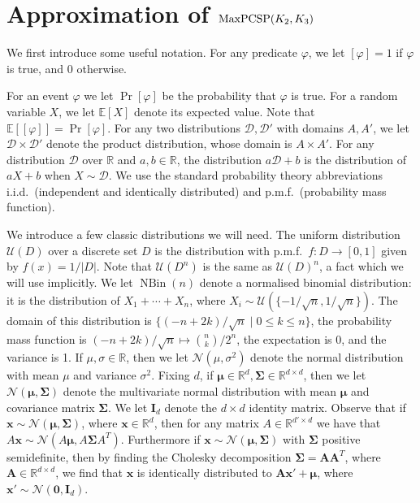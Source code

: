 \documentclass[a4paper,11pt, DIV=11]{scrartcl}
\newcommand{\vx}{\ensuremath{\mathbf{x}}}
\renewcommand{\phi}{\varphi}
\DeclareMathOperator{\NBin}{NBin}
\DeclareMathOperator{\maxPCSP}{\textup{MaxPCSP}}
\renewcommand{\R}{\ensuremath{\mathbb{R}}}
\theoremstyle{plain}
\theoremstyle{definition}
\begin{document}
    

\section{\texorpdfstring{Approximation of $\maxPCSP(K_2,K_3)$}{Approximation of maxPCSP(K2,K3)}}
\label{sec:23}

We first introduce some useful notation.
For any predicate $\phi$, we let $[\phi] = 1$ if $\phi$ is true, and $0$ otherwise.

For an event $\phi$ we let $\Pr [\phi]$ be the probability that $\phi$ is true. For a random variable $X$, we let $\mathbb{E}[X]$ denote its expected value. Note that $\mathbb{E}[ [\phi]] = \Pr[\phi]$.
For any two distributions $\mathcal{D}, \mathcal{D}'$ with domains $A, A'$, we let $\mathcal{D} \times \mathcal{D}'$ denote the product distribution, whose domain is $A \times A'$.
For any distribution $\mathcal{D}$ over $\R$ and $a, b \in \R$, the distribution $a\mathcal{D} + b$ is the distribution of $aX + b$ when $X \sim \mathcal{D}$.
We use the standard probability theory abbreviations i.i.d.~(independent and identically distributed) and p.m.f.~(probability mass function).

We introduce a few classic distributions we will need. The uniform distribution $\mathcal{U}(D)$ over a discrete set $D$ is the distribution with p.m.f.~$f : D \to [0, 1]$ given by $f(x) = 1 / |D|$. Note that $\mathcal{U}(D^n)$ is the same as ${\mathcal{U}(D)}^n$, a fact which we will use implicitly. We let $\NBin(n)$ denote a normalised binomial distribution: it is the distribution of $X_1 + \cdots + X_n$, where $X_i \sim \mathcal{U}(\{-1/\sqrt{n}, 1/\sqrt{n}\})$. The domain of this distribution is $\{(-n + 2k) / \sqrt{n} \mid 0 \leq k \leq n\}$, the probability mass function is $(-n + 2k)/\sqrt{n} \mapsto \binom{n}{k} / 2^n$, the expectation is 0, and the variance is 1.
If $\mu, \sigma \in \R$, then we let $\mathcal{N}(\mu, \sigma^2)$ denote the normal distribution with mean $\mu$ and variance $\sigma^2$. Fixing $d$, if $\mathbf{\mu} \in \R^d, \mathbf{\Sigma} \in \R^{d\times d}$, then we let $\mathcal{N}(\mathbf{\mu}, \mathbf{\Sigma})$ denote the multivariate normal distribution with mean $\mathbf{\mu}$ and covariance matrix $\mathbf{\Sigma}$. We let $\mathbf{I}_d$ denote the $d \times d$ identity matrix. Observe that if $\mathbf{x} \sim \mathcal{N}( \mathbf{\mu}, \mathbf{\Sigma})$, where $\mathbf{x} \in \R^d$, then for any matrix $A \in \R^{d' \times d}$ we have that $A \mathbf{x} \sim \mathcal{N}(A \mathbf{\mu}, A \mathbf{\Sigma} A^T)$. Furthermore if $\mathbf{x} \sim \mathcal{N}(\mathbf{\mu}, \mathbf{\Sigma})$ with $\mathbf{\Sigma}$ positive semidefinite, then by finding the Cholesky decomposition $\mathbf{\Sigma} = \mathbf{A} \mathbf{A}^T$, where $\mathbf{A} \in \R^{d \times d}$, we find that $\vx$ is identically distributed to $\mathbf{A} \vx' + \mathbf{\mu}$, where $\vx' \sim \mathcal{N}(\mathbf{0}, \mathbf{I}_d)$.
\end{document}
